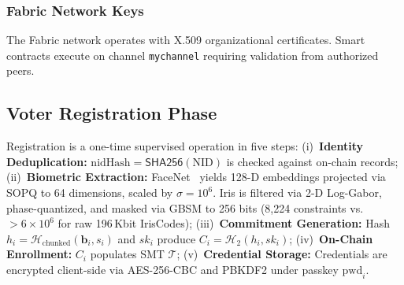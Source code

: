 \documentclass[10pt,letterpaper,journal]{IEEEtran}
\begin{document}
\subsubsection{Fabric Network Keys}
The Fabric network operates with X.509 organizational certificates. Smart contracts execute on channel \texttt{mychannel} requiring validation from authorized peers. 

\subsection{Voter Registration Phase}
Registration is a one-time supervised operation in five steps:
(i)~\textbf{Identity Deduplication:} $\text{nidHash} = \mathsf{SHA256}(\text{NID})$ is checked against on-chain records;
(ii)~\textbf{Biometric Extraction:} FaceNet~\cite{Schroff2015} yields 128-D embeddings projected via SOPQ to 64 dimensions, scaled by $\sigma = 10^6$. Iris is filtered via 2-D Log-Gabor, phase-quantized, and masked via GBSM to 256 bits (8,224 constraints vs.\ $>6\times 10^6$ for raw 196\,Kbit IrisCodes);
(iii)~\textbf{Commitment Generation:} Hash $h_i = \mathcal{H}_{\text{chunked}}(\mathbf{b}_i, s_i)$ and $sk_i$ produce $C_i = \mathcal{H}_2(h_i, sk_i)$;
(iv)~\textbf{On-Chain Enrollment:} $C_i$ populates SMT $\mathcal{T}$;
(v)~\textbf{Credential Storage:} Credentials are encrypted client-side via AES-256-CBC and PBKDF2 under passkey $\text{pwd}_i$.
\end{document}

